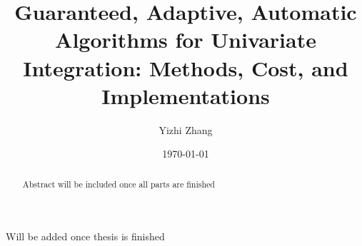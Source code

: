 \documentclass{iitthesis}
\theoremstyle{definition}
\theoremstyle{remark}
\begin{document}
\title{Guaranteed, Adaptive, Automatic Algorithms for Univariate Integration: Methods, Cost, and Implementations}
\author{Yizhi Zhang}
\date{\today}
\copyrightnoticefalse      %
\maketitle                %


\prelimpages         %


\begin{acknowledgement}     %
\par  Will be added once thesis is finished
\end{acknowledgement}


\tableofcontents
\clearpage

\listoftables

\clearpage

\listoffigures

\clearpage


\listofsymbols

 \clearpage



\begin{abstract}           %
\par Abstract will be included once all parts are finished
\end{abstract}


\textpages     %

\end{document}
